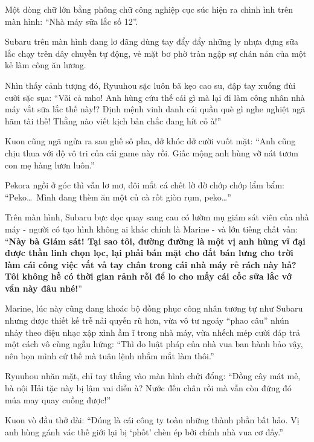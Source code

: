 \documentclass[../main.tex]{subfiles}
\begin{document}
Một dòng chữ lớn bằng phông chữ công nghiệp cục súc hiện ra chình ình trên màn hình: ``Nhà máy sữa lắc số 12''.

Subaru trên màn hình đang lơ đãng dùng tay đẩy đẩy những ly nhựa đựng sữa lắc chạy trên dây chuyền tự động, vẻ mặt bơ phờ tràn ngập sự chán nản của một kẻ làm công ăn lương.


\il

Nhìn thấy cảnh tượng đó, Ryuuhou sặc luôn bã kẹo cao su, đập tay xuống đùi cười sặc sụa: ``Vãi cả mho! Anh hùng cứu thế cái gì mà lại đi làm công nhân nhà máy vắt sữa lắc thế này!? Định mệnh vinh danh cái quần què gì nghe nghiệt ngã hãm tài thế! Thằng nào viết kịch bản chắc đang hít cỏ à!''

Kuon cũng ngã ngửa ra sau ghế sô pha, dở khóc dở cười vuốt mặt: ``Anh cũng chịu thua với độ vô tri của cái game này rồi. Giấc mộng anh hùng vỡ nát tươm con mẹ hàng lươn luôn.''

Pekora ngồi ở góc thì vẫn lơ mơ, đôi mắt cá chết lờ đờ chớp chớp lẩm bẩm: ``Peko\dots\ Mình đang thèm ăn một củ cà rốt giòn rụm, peko\dots''

\il

Trên màn hình, Subaru bực dọc quay sang cau có lườm mụ giám sát viên của nhà máy - người có tạo hình không ai khác chính là Marine - và lớn tiếng chất vấn: ``\textbf{Này bà Giám sát! Tại sao tôi, đường đường là một vị anh hùng vĩ đại được thần linh chọn lọc, lại phải bán mặt cho đất bán lưng cho trời làm cái công việc vất vả tay chân trong cái nhà máy rẻ rách này hả? Tôi không hề có thời gian rảnh rỗi để lo cho mấy cái cốc sữa lắc vớ vẩn này đâu nhé!}''


Marine, lúc này cũng đang khoác bộ đồng phục công nhân tương tự như Subaru nhưng được thiết kế trễ nải quyến rũ hơn, vừa vô tư ngoáy ``phao câu'' nhún nhảy theo điệu nhạc xập xình ầm ĩ trong nhà máy, vừa nhếch mép cười đáp trả một cách vô cùng ngẫu hứng: ``Thì do luật pháp của nhà vua ban hành bảo vậy, nên bọn mình cứ thế mà tuân lệnh nhắm mắt làm thôi.''

\il

Ryuuhou nhăn mặt, chỉ tay thẳng vào màn hình chửi đổng: ``Đồng cây mát mẻ, bà nội Hải tặc này bị lậm vai diễn à? Nước đến chân rồi mà vẫn còn đứng đó múa may quay cuồng được!''

Kuon vò đầu thở dài: ``Đúng là cái công ty toàn những thành phần bất hảo. Vị anh hùng gánh vác thế giới lại bị `phốt' chèn ép bởi chính nhà vua cơ đấy.''
\end{document}
